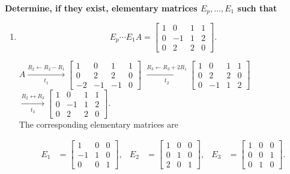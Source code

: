\textbf{Determine, if they exist, elementary matrices
$E_p,\ldots,E_1$ such that}

\begin{enumerate}[label=\roman*)]
    \item
    $$
    E_p\cdots E_1A=
    \begin{bmatrix}
        1 & 0 & 1 & 1 \\
        0 & -1 & 1 & 2 \\
        0 & 2 & 2 & 0
    \end{bmatrix}.
    $$

    \begin{answer}
        $A \xrightarrow[t_1]{R_2 \leftarrow R_2-R_1}
        \begin{bmatrix}
            1 & 0 & 1 & 1 \\
            0 & 2 & 2 & 0 \\
        -2 & -1 & -1 & 0
        \end{bmatrix}
        $
        $\xrightarrow[t_2]{R_3 \leftarrow R_3+2R_1}
        \begin{bmatrix}
            1 & 0 & 1 & 1 \\
            0 & 2 & 2 & 0 \\
            0 & -1 & 1 & 2
        \end{bmatrix}
        $ \\[1.0em]

        $\xrightarrow[t_3]{R_2 \leftrightarrow R_3}
        \begin{bmatrix}
            1 & 0 & 1 & 1 \\
            0 & -1 & 1 & 2 \\
            0 & 2 & 2 & 0
        \end{bmatrix}.
        $ \\[1.0em]

        The corresponding elementary matrices are

        $$
        \begin{aligned}
        E_1 &=
        \begin{bmatrix}
            1 & 0 & 0 \\
        -1 & 1 & 0 \\
            0 & 0 & 1
        \end{bmatrix},
        &
        E_2 &=
        \begin{bmatrix}
            1 & 0 & 0 \\
            0 & 1 & 0 \\
            2 & 0 & 1
        \end{bmatrix},
        &
        E_3 &=
        \begin{bmatrix}
            1 & 0 & 0 \\
            0 & 0 & 1 \\
            0 & 1 & 0
        \end{bmatrix}.
        \end{aligned}
        $$


\end{answer}
\end{enumerate}
